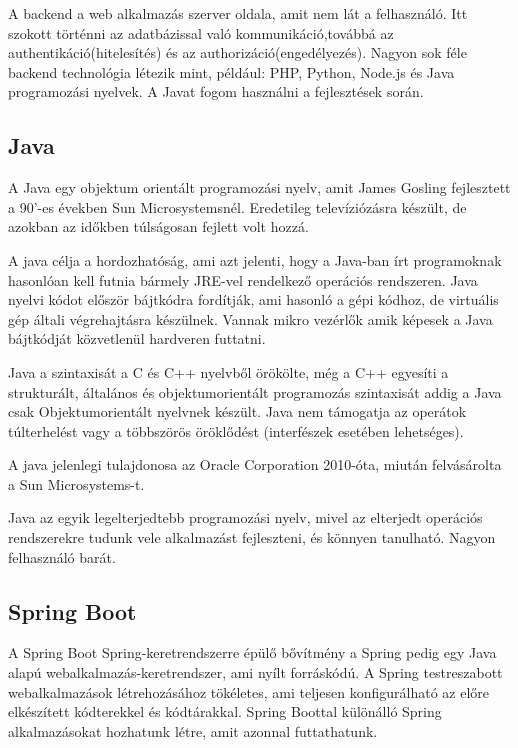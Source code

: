 

A backend a web alkalmazás szerver oldala, amit nem lát a felhasználó. Itt szokott történni az adatbázissal való kommunikáció,továbbá az authentikáció(hitelesítés) és az authorizáció(engedélyezés). Nagyon sok féle backend technológia létezik mint, például: PHP, Python, Node.js és Java programozási nyelvek. A Javat fogom használni a fejlesztések során.

\subsection{Java}

A Java egy objektum orientált programozási nyelv, amit James Gosling fejlesztett a 90’-es években Sun Microsystemsnél. Eredetileg televíziózásra készült, de azokban az időkben túlságosan fejlett volt hozzá.

A java célja a hordozhatóság, ami azt jelenti, hogy a Java-ban írt programoknak hasonlóan kell futnia bármely JRE-vel rendelkező operációs rendszeren. Java nyelvi kódot először bájtkódra fordítják, ami hasonló a gépi kódhoz, de virtuális gép általi végrehajtásra készülnek. Vannak mikro vezérlők amik képesek a Java bájtkódját közvetlenül hardveren futtatni.

Java a szintaxisát a C és C++ nyelvből örökölte, még a C++ egyesíti a strukturált, általános és objektumorientált programozás szintaxisát addig a Java csak Objektumorientált nyelvnek készült. Java nem támogatja az operátok túlterhelést vagy a többszörös öröklődést (interfészek esetében lehetséges).

A java jelenlegi tulajdonosa az Oracle Corporation 2010-óta, miután felvásárolta a Sun Microsystems-t.

Java az egyik legelterjedtebb programozási nyelv, mivel az elterjedt operációs rendszerekre tudunk vele alkalmazást fejleszteni, és könnyen tanulható. Nagyon felhasználó barát\cite{Java}.

\subsection{Spring Boot}

A Spring Boot Spring-keretrendszerre épülő bővítmény a Spring pedig egy Java alapú webalkalmazás-keretrendszer, ami nyílt forráskódú. A Spring testreszabott webalkalmazások létrehozásához tökéletes, ami teljesen konfigurálható az előre elkészített kódterekkel és kódtárakkal. Spring Boottal különálló Spring alkalmazásokat hozhatunk létre, amit azonnal futtathatunk.

